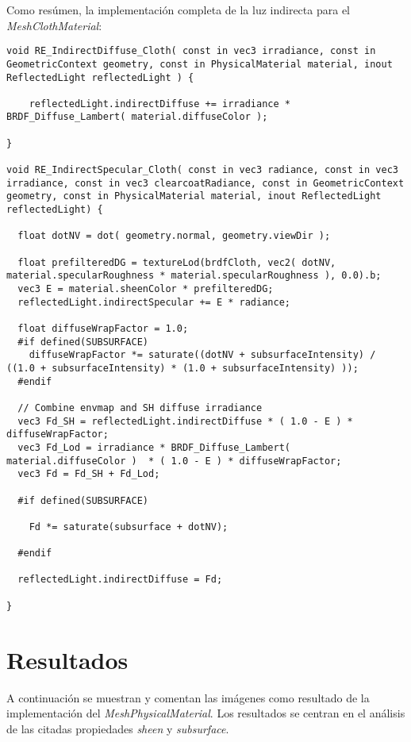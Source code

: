 Como res\'umen, la implementaci\'on completa de la luz indirecta para el \textit{MeshClothMaterial}:\\

    \begin{lstlisting}
void RE_IndirectDiffuse_Cloth( const in vec3 irradiance, const in GeometricContext geometry, const in PhysicalMaterial material, inout ReflectedLight reflectedLight ) {

    reflectedLight.indirectDiffuse += irradiance * BRDF_Diffuse_Lambert( material.diffuseColor );

}

void RE_IndirectSpecular_Cloth( const in vec3 radiance, const in vec3 irradiance, const in vec3 clearcoatRadiance, const in GeometricContext geometry, const in PhysicalMaterial material, inout ReflectedLight reflectedLight) {

  float dotNV = dot( geometry.normal, geometry.viewDir );

  float prefilteredDG = textureLod(brdfCloth, vec2( dotNV, material.specularRoughness * material.specularRoughness ), 0.0).b;
  vec3 E = material.sheenColor * prefilteredDG;
  reflectedLight.indirectSpecular += E * radiance;

  float diffuseWrapFactor = 1.0;
  #if defined(SUBSURFACE)
    diffuseWrapFactor *= saturate((dotNV + subsurfaceIntensity) / ((1.0 + subsurfaceIntensity) * (1.0 + subsurfaceIntensity) ));
  #endif

  // Combine envmap and SH diffuse irradiance
  vec3 Fd_SH = reflectedLight.indirectDiffuse * ( 1.0 - E ) * diffuseWrapFactor;
  vec3 Fd_Lod = irradiance * BRDF_Diffuse_Lambert( material.diffuseColor )  * ( 1.0 - E ) * diffuseWrapFactor;
  vec3 Fd = Fd_SH + Fd_Lod;

  #if defined(SUBSURFACE)

    Fd *= saturate(subsurface + dotNV);

  #endif

  reflectedLight.indirectDiffuse = Fd;

}
    \end{lstlisting}
    \singlespacing

\section{Resultados}

A continuaci\'on se muestran y comentan las im\'agenes como resultado de la implementaci\'on del \textit{MeshPhysicalMaterial}. Los resultados se centran
en el an\'alisis de las citadas propiedades \textit{sheen} y \textit{subsurface}.

